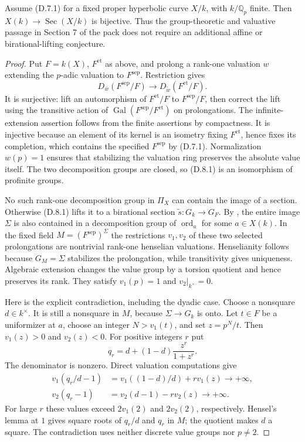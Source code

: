Assume (D.7.1) for a fixed proper hyperbolic curve $X/k$, with
$k/\mathbb Q_p$ finite.  Then $X(k)\to\operatorname{Sec}(X/k)$ is bijective.
Thus the group-theoretic and valuative passage in Section 7 of the pack does
not require an additional affine or birational-lifting conjecture.
\begin{proof}
Put $F=k(X)$, $F^{\mathrm{et}}$ as above, and prolong a rank-one valuation $w$
extending the $p$-adic valuation to $F^{\mathrm{sep}}$.
Restriction gives
\[
 D_{\bar w}(F^{\mathrm{sep}}/F)
   \longrightarrow D_{\widetilde w}(F^{\mathrm{et}}/F).
 \tag{D.8.1}
\]
It is surjective: lift an automorphism of $F^{\mathrm{et}}/F$ to
$F^{\mathrm{sep}}/F$, then correct the lift using the transitive action of
$\operatorname{Gal}(F^{\mathrm{sep}}/F^{\mathrm{et}})$ on prolongations.
The infinite-extension assertion follows from the finite assertions by
compactness.  It is injective because an element of its kernel is an isometry
fixing $F^{\mathrm{et}}$, hence fixes its completion, which contains the
specified $F^{\mathrm{sep}}$ by (D.7.1).  Normalization $w(p)=1$ ensures that
stabilizing the valuation ring preserves the absolute value itself.  The two
decomposition groups are closed, so (D.8.1) is an isomorphism of profinite groups.

No such rank-one decomposition group in $\Pi_X$ can contain the image of a
section.  Otherwise (D.8.1) lifts it to a birational section
$\widetilde s:G_k\to G_F$.  By
\citet[Proposition 2.4(2), Definition 1.4, and Observation 1.3]{Koenigsmann2005},
the entire image $\Sigma$ is also contained in a decomposition group of
$\operatorname{ord}_a$ for some $a\in X(k)$.
In the fixed field $M=(F^{\mathrm{sep}})^\Sigma$ the restrictions $v_1,v_2$
of these two selected prolongations are nontrivial rank-one henselian
valuations.  Henselianity follows because $G_M=\Sigma$ stabilizes the
prolongation, while transitivity gives uniqueness.  Algebraic extension
changes the value group by a torsion quotient and hence preserves its rank.
They satisfy $v_1(p)=1$ and $v_2|_{k^\times}=0$.

Here is the explicit contradiction, including the dyadic case.  Choose a
nonsquare $d\in k^\times$.  It is still a nonsquare in $M$, because
$\Sigma\to G_k$ is onto.  Let $t\in F$ be a uniformizer at $a$, choose an
integer $N>v_1(t)$, and set $z=p^N/t$.  Then $v_1(z)>0$ and $v_2(z)<0$.
For positive integers $r$ put
\[
 q_r=d+(1-d)\frac{z^r}{1+z^r}.
\]
The denominator is nonzero.  Direct valuation computations give
\[
 \begin{split}
 v_1(q_r/d-1)&=v_1((1-d)/d)+r v_1(z)\longrightarrow+\infty,\\
 v_2(q_r-1)&=v_2(d-1)-r v_2(z)\longrightarrow+\infty.
 \end{split}
\]
For large $r$ these values exceed $2v_1(2)$ and $2v_2(2)$, respectively.
Hensel's lemma at $1$ gives square roots of $q_r/d$ and $q_r$ in $M$;
the quotient makes $d$ a square.  The contradiction uses neither discrete
value groups nor $p\ne2$.


\end{proof}

